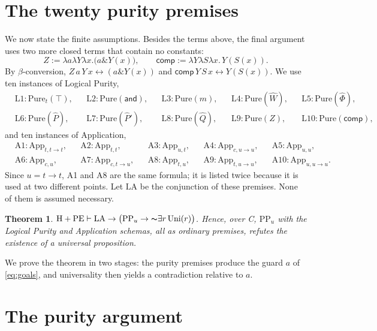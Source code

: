 \documentclass[12pt,leqno]{article}
\newcommand{\AND}{\ensuremath{\mathbin{\&}}}
\newcommand{\IFF}{\ensuremath{\leftrightarrow}}
\newcommand{\IC}{\ensuremath{\rightarrow}}
\newcommand{\NOT}{\ensuremath{\text{$\thicksim$}}}
\newcommand{\dentails}{\ensuremath{\vdash}}
\newcommand{\Pure}{\ensuremath{\mathrm{Pure}}}
\newcommand{\Uni}{\ensuremath{\mathrm{Uni}}}
\newcommand{\PPu}{\ensuremath{\mathrm{PP}_u}}
\newcommand{\HPE}{\ensuremath{\mathrm{H}+\mathrm{PE}}}
\newcommand{\App}{\ensuremath{\mathrm{App}}}
\newcommand{\hW}{\ensuremath{\widehat{W}}}
\newcommand{\hQ}{\ensuremath{\widehat{Q}}}
\newcommand{\hP}{\ensuremath{\widehat{P}}}
\newcommand{\hPp}{\ensuremath{\widehat{P}'}}
\newcommand{\hPhi}{\ensuremath{\widehat{\Phi}}}
\newcommand{\conj}{\ensuremath{\mathsf{and}}}
\newcommand{\cmp}{\ensuremath{\mathsf{comp}}}
\theoremstyle{plain}
\newtheorem{theorem}{Theorem}
\begin{document}
\section{The twenty purity premises}\label{sec:premises}

We now state the finite assumptions. Besides the terms above, the final
argument uses two more closed terms that contain no constants:
\[
 Z:=\lambda a\lambda Y\lambda x.\bigl(a\AND Y(x)\bigr),\qquad
 \cmp:=\lambda Y\lambda S\lambda x.\,Y(S(x)).
\]
By \(\beta\)-conversion, \(Z\,a\,Y\,x\IFF(a\AND Y(x))\) and
\(\cmp\,Y\,S\,x\IFF Y(S(x))\). We use ten instances of Logical Purity,
\[
 \begin{aligned}
 &\mathrm{L1}:\Pure_t(\top),&&\mathrm{L2}:\Pure(\conj),&&
  \mathrm{L3}:\Pure(m),&&\mathrm{L4}:\Pure(\hW),&&
  \mathrm{L5}:\Pure(\hPhi),\\
 &\mathrm{L6}:\Pure(\hP),&&\mathrm{L7}:\Pure(\hPp),&&
  \mathrm{L8}:\Pure(\hQ),&&\mathrm{L9}:\Pure(Z),&&
  \mathrm{L10}:\Pure(\cmp),
 \end{aligned}
\]
and ten instances of Application,
\[
 \begin{aligned}
 &\mathrm{A1}:\App_{t,t\IC t},&&\mathrm{A2}:\App_{t,t},&&
  \mathrm{A3}:\App_{u,t},&&\mathrm{A4}:\App_{c,u\IC u},&&
  \mathrm{A5}:\App_{u,u},\\
 &\mathrm{A6}:\App_{c,u},&&\mathrm{A7}:\App_{c,t\IC u},&&
  \mathrm{A8}:\App_{t,u},&&\mathrm{A9}:\App_{t,u\IC u},&&
  \mathrm{A10}:\App_{u,u\IC u}.
 \end{aligned}
\]
Since \(u=t\IC t\), A1 and A8 are the same formula; it is listed twice
because it is used at two different points. Let \(\mathrm{LA}\) be the
conjunction of these premises. None of them is assumed necessary.

\begin{theorem}\label{thm:main}
\(\HPE\dentails\mathrm{LA}\IC\bigl(\PPu\IC\NOT\exists r\,\Uni(r)\bigr)\).
Hence, over C, \(\PPu\) with the Logical Purity and Application schemas,
all as ordinary premises, refutes the existence of a universal
proposition.
\end{theorem}

We prove the theorem in two stages: the purity premises produce the
guard \(a\) of \eqref{eq:goals}, and universality then yields a
contradiction relative to \(a\).

\section{The purity argument}\label{sec:purity}
\end{document}

